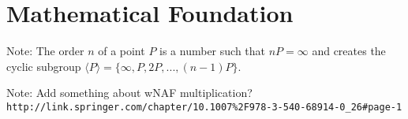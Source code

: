 \section{Mathematical Foundation}

Note: The order \(n\) of a point \(P\) is a number such that \(nP = \infty\) and creates
the cyclic subgroup \(\langle P \rangle = \{ \infty, P, 2P, ..., (n-1)P \} \).

Note: Add something about wNAF multiplication? \verb+http://link.springer.com/chapter/10.1007%2F978-3-540-68914-0_26#page-1+



